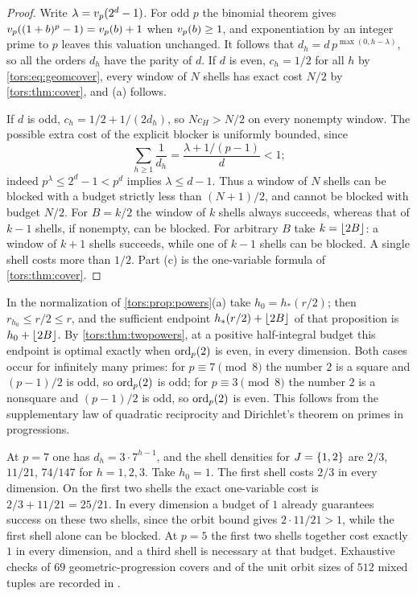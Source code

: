 \begin{proof}
Write $\lambda=v_p(2^d-1)$. For odd $p$ the binomial theorem gives
$v_p((1+b)^p-1)=v_p(b)+1$ when $v_p(b)\ge1$, and exponentiation by an integer prime to $p$
leaves this valuation unchanged. It follows that $d_h=d\,p^{\max(0,h-\lambda)}$, so all the
orders $d_h$ have the parity of $d$. If $d$ is even, $c_h=1/2$ for all $h$ by
\eqref{tors:eq:geomcover}, every window of $N$ shells has exact cost $N/2$ by
\cref{tors:thm:cover}, and (a) follows.

If $d$ is odd, $c_h=1/2+1/(2d_h)$, so $Nc_H>N/2$ on every nonempty window. The possible
extra cost of the explicit blocker is uniformly bounded, since
\[
  \sum_{h\ge1}\frac1{d_h}=\frac{\lambda+1/(p-1)}{d}<1 ;
\]
indeed $p^\lambda\le2^d-1<p^d$ implies $\lambda\le d-1$. Thus a window of $N$ shells can be
blocked with a budget strictly less than $(N+1)/2$, and cannot be blocked with budget
$N/2$. For $B=k/2$ the window of $k$ shells always succeeds, whereas that of $k-1$ shells,
if nonempty, can be blocked. For arbitrary $B$ take $k=\lfloor2B\rfloor$: a window of $k+1$
shells succeeds, while one of $k-1$ shells can be blocked. A single shell costs more than
$1/2$. Part (c) is the one-variable formula of \cref{tors:thm:cover}.
\end{proof}

\begin{remark}[The endpoint of \cref{tors:prop:powers}(a) for $m=2$]\label{tors:rem:twopowers}
In the normalization of \cref{tors:prop:powers}(a) take $h_0=h_*(r/2)$; then
$r_{h_0}\le r/2\le r$, and the sufficient endpoint $h_*(r/2)+\lfloor2B\rfloor$ of that
proposition is $h_0+\lfloor2B\rfloor$. By \cref{tors:thm:twopowers}, at a positive
half-integral budget this endpoint is optimal exactly when $\operatorname{ord}_p(2)$ is even, in every
dimension. Both cases occur for infinitely many primes: for $p\equiv7\pmod8$ the number $2$
is a square and $(p-1)/2$ is odd, so $\operatorname{ord}_p(2)$ is odd; for $p\equiv3\pmod8$ the number
$2$ is a nonsquare and $(p-1)/2$ is odd, so $\operatorname{ord}_p(2)$ is even. This follows from the
supplementary law of quadratic reciprocity and Dirichlet's theorem on primes in
progressions.
\end{remark}

\begin{example}\label{tors:ex:twopowers}
At $p=7$ one has $d_h=3\cdot7^{h-1}$, and the shell densities for $J=\{1,2\}$ are
$2/3$, $11/21$, $74/147$ for $h=1,2,3$. Take $h_0=1$. The first shell costs $2/3$ in every
dimension. On the first two shells the exact one-variable cost is $2/3+11/21=25/21$. In
every dimension a budget of $1$ already guarantees success on these two shells, since the
orbit bound gives $2\cdot11/21>1$, while the first shell alone can be blocked. At $p=5$
the first two shells together cost exactly $1$ in every dimension, and a third shell is
necessary at that budget. Exhaustive checks of $69$ geometric-progression covers and of
the unit orbit sizes of $512$ mixed tuples are recorded in
.
\end{example}

